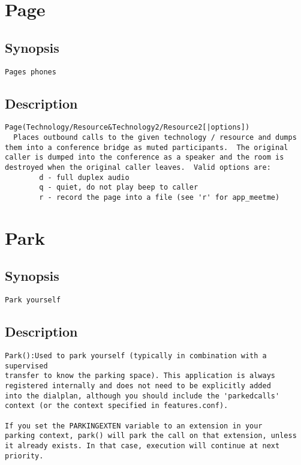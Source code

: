 \section{Page}
\subsection{Synopsis}
\begin{verbatim}
Pages phones
\end{verbatim}
\subsection{Description}
\begin{verbatim}
Page(Technology/Resource&Technology2/Resource2[|options])
  Places outbound calls to the given technology / resource and dumps
them into a conference bridge as muted participants.  The original
caller is dumped into the conference as a speaker and the room is
destroyed when the original caller leaves.  Valid options are:
        d - full duplex audio
        q - quiet, do not play beep to caller
        r - record the page into a file (see 'r' for app_meetme)

\end{verbatim}


\section{Park}
\subsection{Synopsis}
\begin{verbatim}
Park yourself
\end{verbatim}
\subsection{Description}
\begin{verbatim}
Park():Used to park yourself (typically in combination with a supervised
transfer to know the parking space). This application is always
registered internally and does not need to be explicitly added
into the dialplan, although you should include the 'parkedcalls'
context (or the context specified in features.conf).

If you set the PARKINGEXTEN variable to an extension in your
parking context, park() will park the call on that extension, unless
it already exists. In that case, execution will continue at next
priority.

\end{verbatim}


